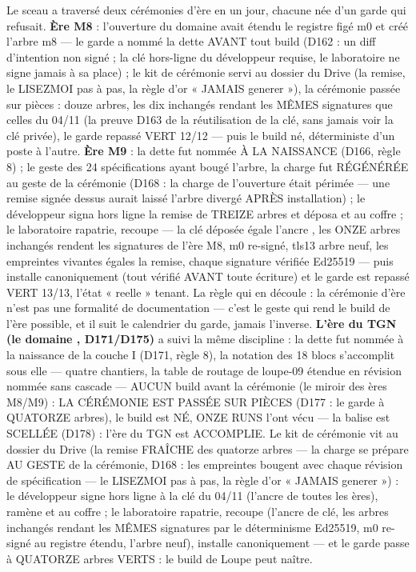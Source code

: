 Le sceau a traversé deux cérémonies d'ère en un jour, chacune née d'un garde qui
refusait. \textbf{Ère M8} : l'ouverture du domaine  avait étendu le
registre figé m0 et créé l'arbre m8 — le garde a nommé la dette AVANT tout build
(D162 : un diff d'intention non signé ; la clé hors-ligne du développeur requise,
le laboratoire ne signe jamais à sa place) ; le kit de cérémonie servi au dossier
 du Drive (la remise, le LISEZMOI pas à pas, la règle d'or
« JAMAIS generer »), la cérémonie passée sur pièces : douze arbres, les dix
inchangés rendant les MÊMES signatures que celles du 04/11 (la preuve D163 de la
réutilisation de la clé, sans jamais voir la clé privée), le garde repassé VERT
12/12 — puis le build  né, déterministe d'un poste à l'autre.
\textbf{Ère M9} : la dette fut nommée À LA NAISSANCE (D166, règle 8) ; le geste
des 24 spécifications ayant bougé l'arbre, la charge fut RÉGÉNÉRÉE au geste de la
cérémonie (D168 : la charge de l'ouverture était périmée — une remise signée
dessus aurait laissé l'arbre divergé APRÈS installation) ; le développeur signa
hors ligne la remise de TREIZE arbres et déposa  et
 au coffre  ; le laboratoire rapatrie,
recoupe — la clé déposée égale l'ancre , les ONZE arbres
inchangés rendent les signatures de l'ère M8, m0 re-signé, tls13 arbre neuf, les
empreintes vivantes égales la remise, chaque signature vérifiée Ed25519 — puis
installe canoniquement (tout vérifié AVANT toute écriture) et le garde est
repassé VERT 13/13, l'état « reelle » tenant. La règle qui en découle : la
cérémonie d'ère n'est pas une formalité de documentation — c'est le geste qui
rend le build de l'ère possible, et il suit le calendrier du garde, jamais
l'inverse. \textbf{L'ère du TGN (le domaine , D171/D175)} a suivi la même
discipline : la dette fut nommée à la naissance de la couche I (D171, règle 8), la
notation des 18 blocs s'accomplit sous elle — quatre chantiers, la table de routage
de loupe-09 étendue en révision nommée sans cascade — AUCUN build avant la
cérémonie (le miroir des ères M8/M9) : LA CÉRÉMONIE EST PASSÉE SUR PIÈCES (D177 :
le garde à QUATORZE arbres), le build est NÉ, ONZE RUNS l'ont vécu — la balise
 est SCELLÉE (D178) : l'ère du TGN est ACCOMPLIE. Le kit de cérémonie vit au dossier
 du Drive (la remise FRAÎCHE des quatorze arbres — la charge se
prépare AU GESTE de la cérémonie, D168 : les empreintes bougent avec chaque
révision de spécification — le LISEZMOI pas à pas, la règle d'or « JAMAIS generer »)
: le développeur signe hors ligne à la clé du 04/11 (l'ancre de toutes les ères),
ramène  et  au coffre 
; le laboratoire rapatrie, recoupe (l'ancre de clé, les arbres inchangés rendant
les MÊMES signatures par le déterminisme Ed25519, m0 re-signé au registre étendu,
l'arbre  neuf), installe canoniquement — et le garde passe à QUATORZE
arbres VERTS : le build de Loupe peut naître.

